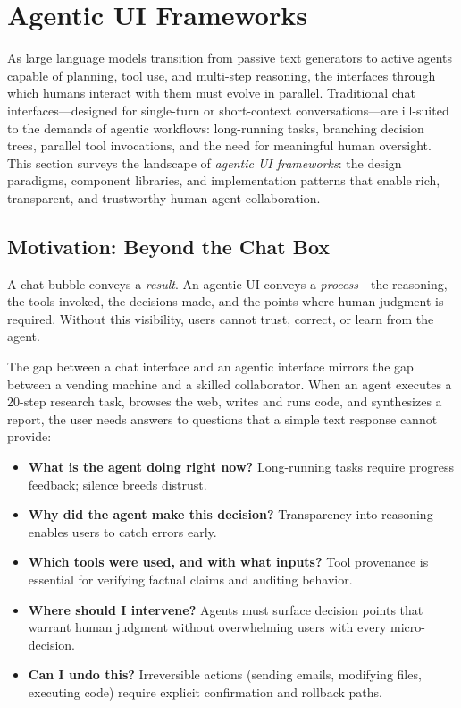 \chapter{Agentic UI Frameworks}
\label{sec:agentic-ui}

As large language models transition from passive text generators to active agents capable of planning, tool use, and multi-step reasoning, the interfaces through which humans interact with them must evolve in parallel. Traditional chat interfaces---designed for single-turn or short-context conversations---are ill-suited to the demands of agentic workflows: long-running tasks, branching decision trees, parallel tool invocations, and the need for meaningful human oversight. This section surveys the landscape of \emph{agentic UI frameworks}: the design paradigms, component libraries, and implementation patterns that enable rich, transparent, and trustworthy human-agent collaboration.

\section{Motivation: Beyond the Chat Box}
\label{subsec:ui-motivation}

\begin{intuitionbox}
A chat bubble conveys a \emph{result}. An agentic UI conveys a \emph{process}---the reasoning, the tools invoked, the decisions made, and the points where human judgment is required. Without this visibility, users cannot trust, correct, or learn from the agent.
\end{intuitionbox}

The gap between a chat interface and an agentic interface mirrors the gap between a vending machine and a skilled collaborator. When an agent executes a 20-step research task, browses the web, writes and runs code, and synthesizes a report, the user needs answers to questions that a simple text response cannot provide:

\begin{itemize}
  \item \textbf{What is the agent doing right now?} Long-running tasks require progress feedback; silence breeds distrust.
  \item \textbf{Why did the agent make this decision?} Transparency into reasoning enables users to catch errors early.
  \item \textbf{Which tools were used, and with what inputs?} Tool provenance is essential for verifying factual claims and auditing behavior.
  \item \textbf{Where should I intervene?} Agents must surface decision points that warrant human judgment without overwhelming users with every micro-decision.
  \item \textbf{Can I undo this?} Irreversible actions (sending emails, modifying files, executing code) require explicit confirmation and rollback paths.
\end{itemize}

